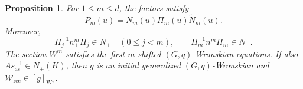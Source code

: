 \documentclass[11pt,leqno]{amsart}
\numberwithin{equation}{section}
\theoremstyle{plain}
\newtheorem{proposition}[theorem]{Proposition}
\theoremstyle{definition}
\theoremstyle{plain}
\theoremstyle{definition}
\theoremstyle{remark}
\begin{document}
\begin{proposition}\label{prop:successive-Wronskian-factorization}
For $1\le m\le d$, the factors satisfy
\begin{equation}\label{eq:chosen-trivialization-product-factorization}
 P_m(u)=N_m(u)\Pi_m(u)\widetilde N_m(u).
\end{equation}
Moreover,
\begin{equation}\label{eq:chosen-trivialization-layer-positivity}
 \Pi_j^{-1}n_+^m\Pi_j\in N_+\quad(0\le j<m),
 \qquad
 \Pi_m^{-1}n_+^m\Pi_m\in N_-.
\end{equation}
The section $W^m$ satisfies the first $m$ shifted $(G,q)$-Wronskian equations.
If also $As_{\mathrm{as}}^{-1}\in N_+(K)$, then $g$ is an initial generalized $(G,q)$-Wronskian and $\mathscr W_{\mathrm{rec}}\in[g]_{\mathrm{Wr}}$.
\end{proposition}
\end{document}

